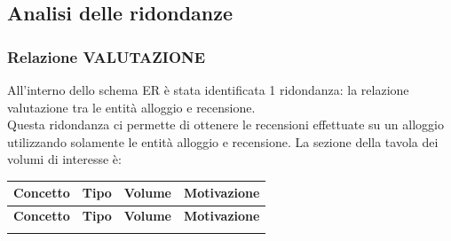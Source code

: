 \subsection{Analisi delle ridondanze}
\subsubsection{Relazione VALUTAZIONE}
All'interno dello schema ER è stata identificata 1 ridondanza: la relazione valutazione tra le entità alloggio e recensione.\\
Questa ridondanza ci permette di ottenere le recensioni effettuate su un alloggio utilizzando solamente le entità alloggio e recensione.
La sezione della tavola dei volumi di interesse è:

\small
\setlength\extrarowheight{2pt}
\begin{longtable}{|l|c|c|p{6.3cm}|}
      \hline \textbf{Concetto} & \textbf{Tipo} & \textbf{Volume} & \textbf{Motivazione}                                                                                                                         \\\hline
      \endfirsthead

      \hline \textbf{Concetto} & \textbf{Tipo} & \textbf{Volume} & \textbf{Motivazione}                                                                                                                         \\\hline
      \endhead

      \endfoot


\end{longtable}
